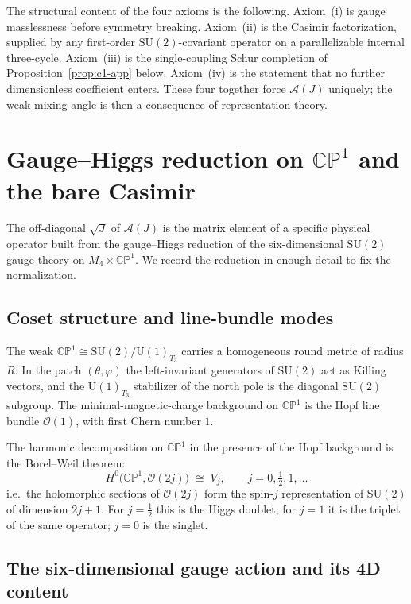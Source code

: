\documentclass[aps,prd,onecolumn,superscriptaddress,nofootinbib,reprint]{revtex4-2}
\newcommand{\half}{\tfrac12}
\newcommand{\cA}{\mathcal{A}}
\newcommand{\cO}{\mathcal{O}}
\newcommand{\SU}{\mathrm{SU}}
\newcommand{\U}{\mathrm{U}}
\newcommand{\CP}{\mathbb{CP}}
\begin{document}
The structural content of the four axioms is the following.  Axiom~(i)
is gauge masslessness before symmetry breaking.  Axiom~(ii) is the
Casimir factorization, supplied by any first-order
$\SU(2)$-covariant operator on a parallelizable internal three-cycle.
Axiom~(iii) is the single-coupling Schur completion of
Proposition~\ref{prop:c1-app} below.  Axiom~(iv) is the statement that
no further dimensionless coefficient enters.  These four together
force $\cA(J)$ uniquely; the weak mixing angle is then a consequence
of representation theory.

\section{Gauge--Higgs reduction on \texorpdfstring{$\CP^{1}$}{CP1} and the bare Casimir}
\label{app:gh}

The off-diagonal $\sqrt{J}$ of $\cA(J)$ is the matrix element of a
specific physical operator built from the gauge--Higgs reduction of the
six-dimensional $\SU(2)$ gauge theory on $M_{4}\times\CP^{1}$.  We
record the reduction in enough detail to fix the normalization.

\subsection{Coset structure and line-bundle modes}

The weak $\CP^{1}\cong\SU(2)/\U(1)_{T_{3}}$ carries a homogeneous round
metric of radius $R$.  In the patch $(\theta,\varphi)$ the
left-invariant generators of $\SU(2)$ act as Killing vectors, and the
$\U(1)_{T_{3}}$ stabilizer of the north pole is the diagonal
$\SU(2)$ subgroup.  The minimal-magnetic-charge background on $\CP^{1}$
is the Hopf line bundle $\cO(1)$, with first Chern number $1$.

The harmonic decomposition on $\CP^{1}$ in the presence of the Hopf
background is the Borel--Weil theorem:
\begin{equation}
  H^{0}\bigl(\CP^{1},\cO(2j)\bigr)\;\cong\;V_{j},\qquad j=0,\half,1,\dots
\label{eq:bw-app}
\end{equation}
i.e.\ the holomorphic sections of $\cO(2j)$ form the spin-$j$
representation of $\SU(2)$ of dimension $2j+1$.  For $j=\half$ this is
the Higgs doublet; for $j=1$ it is the triplet of the same operator;
$j=0$ is the singlet.

\subsection{The six-dimensional gauge action and its 4D content}
\end{document}
